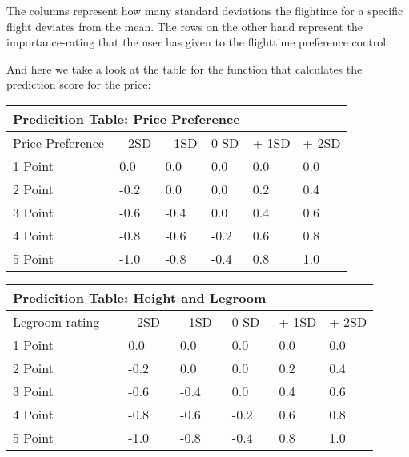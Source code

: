 \documentclass[a4paper]{article}
\begin{document}
\vspace{0.5cm}

The columns represent how many standard deviations the flightime for a specific flight deviates from the mean. The rows on the other hand represent the importance-rating that the user has given to the flighttime preference control.


And here we take a look at the table for the function that calculates the prediction score for the price:

\vspace{0.5cm}

\begin{tabular}{ |p{3.5cm}||p{1.5cm}|p{1.5cm}|p{1.5cm}|p{1.5cm}|p{1.5cm}|  }
 \hline
 \multicolumn{4}{|c|}{Predicition Table: Price Preference} \\
 \hline
 Price Preference & - 2SD & - 1SD & 0 SD & + 1SD & + 2SD\\
 \hline
 1 Point   & 0.0    & 0.0 & 0.0 & 0.0 & 0.0 \\
 2 Point &   -0.2  & 0.0   & 0.0 & 0.2 & 0.4 \\
 3 Point & -0.6 & -0.4 &  0.0 & 0.4 & 0.6\\
 4 Point & -0.8   & -0.6 & -0.2 &  0.6 & 0.8\\
 5 Point & -1.0  & -0.8 & -0.4 & 0.8 & 1.0\\

 \hline
\end{tabular}

\vspace{0.5cm}


\vspace{0.5cm}

\begin{tabular}{ |p{3.5cm}||p{1.5cm}|p{1.5cm}|p{1.5cm}|p{1.5cm}|p{1.5cm}|  }
 \hline
 \multicolumn{4}{|c|}{Predicition Table: Height and Legroom} \\
 \hline
 Legroom rating & - 2SD & - 1SD & 0 SD & + 1SD & + 2SD\\
 \hline
 1 Point   & 0.0    & 0.0 & 0.0 & 0.0 & 0.0 \\
 2 Point &   -0.2  & 0.0   & 0.0 & 0.2 & 0.4 \\
 3 Point & -0.6 & -0.4 &  0.0 & 0.4 & 0.6\\
 4 Point & -0.8   & -0.6 & -0.2 &  0.6 & 0.8\\
 5 Point & -1.0  & -0.8 & -0.4 & 0.8 & 1.0\\

 \hline
\end{tabular}
\end{document}
